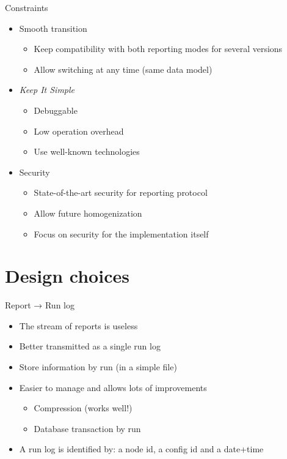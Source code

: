 \documentclass[aspectratio=169, 14pt]{beamer}
\begin{document}
\begin{frame}{Constraints}
	\begin{itemize}
		\item Smooth transition
		      \begin{itemize}
			      \item Keep compatibility with both reporting modes for several versions
			      \item Allow switching at any time (same data model)
		      \end{itemize}
		\item \emph{Keep It Simple}
		      \begin{itemize}
			      \item Debuggable
			      \item Low operation overhead
			      \item Use well-known technologies
		      \end{itemize}
		\item Security
		      \begin{itemize}
			      \item State-of-the-art security for reporting protocol
			      \item Allow future homogenization
			      \item Focus on security for the implementation itself
		      \end{itemize}
	\end{itemize}
\end{frame}

\section{Design choices}

\begin{frame}{Report → Run log}

	\begin{itemize}
		\item The stream of reports is useless
		\item Better transmitted as a single run log
		\item Store information by run (in a simple file)
		\item Easier to manage and allows lots of improvements
		      \begin{itemize}
			      \item Compression (works well!)
			      \item Database transaction by run
		      \end{itemize}
		\item A run log is identified by: a node id, a config id and a date+time
	\end{itemize}
\end{frame}
\end{document}
